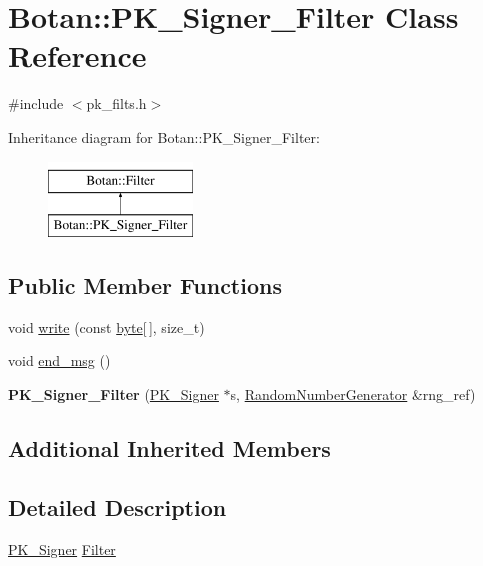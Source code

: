 \hypertarget{classBotan_1_1PK__Signer__Filter}{\section{Botan\-:\-:P\-K\-\_\-\-Signer\-\_\-\-Filter Class Reference}
\label{classBotan_1_1PK__Signer__Filter}
}


{\ttfamily \#include $<$pk\-\_\-filts.\-h$>$}

Inheritance diagram for Botan\-:\-:P\-K\-\_\-\-Signer\-\_\-\-Filter\-:\begin{figure}[H]
\begin{center}
\leavevmode
\includegraphics[height=2.000000cm]{classBotan_1_1PK__Signer__Filter}
\end{center}
\end{figure}
\subsection*{Public Member Functions}
\begin{DoxyCompactItemize}
\item 
void \hyperlink{classBotan_1_1PK__Signer__Filter_a78ebbc19d0f9ae8e919526b3d6012688}{write} (const \hyperlink{namespaceBotan_a7d793989d801281df48c6b19616b8b84}{byte}\mbox{[}$\,$\mbox{]}, size\-\_\-t)
\item 
void \hyperlink{classBotan_1_1PK__Signer__Filter_a8d17f9c0f5e036f3a898c0f50e3ce6fc}{end\-\_\-msg} ()
\item 
\hypertarget{classBotan_1_1PK__Signer__Filter_a79cf358481ca0506bc9059387e9ba28e}{{\bfseries P\-K\-\_\-\-Signer\-\_\-\-Filter} (\hyperlink{classBotan_1_1PK__Signer}{P\-K\-\_\-\-Signer} $\ast$s, \hyperlink{classBotan_1_1RandomNumberGenerator}{Random\-Number\-Generator} \&rng\-\_\-ref)}\label{classBotan_1_1PK__Signer__Filter_a79cf358481ca0506bc9059387e9ba28e}

\end{DoxyCompactItemize}
\subsection*{Additional Inherited Members}


\subsection{Detailed Description}
\hyperlink{classBotan_1_1PK__Signer}{P\-K\-\_\-\-Signer} \hyperlink{classBotan_1_1Filter}{Filter} 


